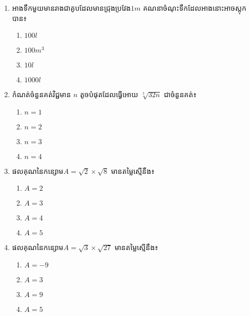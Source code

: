 \begin{enumerate}
\item អាងទឹកមួយមានរាងជាគូបដែលមានជ្រុងប្រវែង$1m$ គណនាចំណុះទឹកដែលអាងនោះអាចស្តុកបាន៖
\begin{multicols}{4}
\begin{enumerate}[label=\alph*.]
	\item $100l$
	\item $100m^3$
	\item $10l$
	\item $1000l$
\end{enumerate}
\end{multicols}

\item កំណត់ចំនួនគត់វិជ្ជមាន $n$ តូចបំផុតដែលធ្វើអោយ $\sqrt[3]{32n}$ ជាចំនួនគត់៖
\begin{multicols}{4}
\begin{enumerate}[label=\alph*.]
	\item $n=1$
	\item $n=2$
	\item $n=3$
	\item $n=4$
\end{enumerate}
\end{multicols}

\item ផលគុណនៃកន្សោម$A=\sqrt{2}\times \sqrt{8}$  មានតម្លៃស្មើនឹង៖
\begin{multicols}{4}
\begin{enumerate}[label=\alph*.]
	\item $A=2$
	\item $A=3$
	\item $A=4$
	\item $A=5$
\end{enumerate}
\end{multicols}
\item ផលគុណនៃកន្សោម$A=\sqrt{3}\times \sqrt{27}$  មានតម្លៃស្មើនឹង៖
\begin{multicols}{4}
\begin{enumerate}[label=\alph*.]
	\item $A=-9$
	\item $A=3$
	\item $A=9$
	\item $A=5$
\end{enumerate}
\end{multicols}


\end{enumerate}
